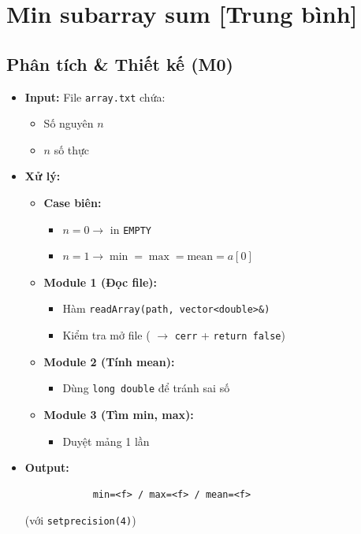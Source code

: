 \section{Min subarray sum [Trung bình]}
\subsection{Phân tích \& Thiết kế (M0)}
    \begin{itemize}
    \item \textbf{Input:}
    File \texttt{array.txt} chứa:
    \begin{itemize}
        \item Số nguyên $n$
        \item $n$ số thực
    \end{itemize}

    \item \textbf{Xử lý:}
        \begin{itemize}
            \item \textbf{Case biên:}
            \begin{itemize}
                \item $n = 0 \rightarrow$ in \texttt{EMPTY}
                \item $n = 1 \rightarrow \min = \max = \text{mean} = a[0]$
            \end{itemize}
            
            \item \textbf{Module 1 (Đọc file):}
            \begin{itemize}
                \item Hàm \texttt{readArray(path, vector<double>\&)}
                \item Kiểm tra mở file ( $\rightarrow$ \texttt{cerr} + \texttt{return false})
            \end{itemize}
            
            \item \textbf{Module 2 (Tính mean):}
            \begin{itemize}
                \item Dùng \texttt{long double} để tránh sai số
            \end{itemize}
            
            \item \textbf{Module 3 (Tìm min, max):}
            \begin{itemize}
                \item Duyệt mảng 1 lần
            \end{itemize}
        \end{itemize}

        \item \textbf{Output:}
        \begin{lstlisting}
            min=<f> / max=<f> / mean=<f>\end{lstlisting} 
        (với \texttt{setprecision(4)})
    \end{itemize}


